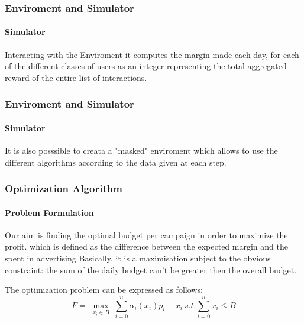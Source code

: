 \documentclass{beamer}
\begin{document}
\begin {frame}
\frametitle{Enviroment and Simulator}
\framesubtitle{Simulator}
Interacting with the Enviroment it computes the margin made each day, for each of the different classes of users as an integer representing the total aggregated reward of the entire list of interactions.
\end{frame}
\begin {frame}
\frametitle{Enviroment and Simulator}
\framesubtitle{Simulator}
It is also posssible to creata a "masked" enviroment which allows to use the different algorithms according to the data given at each step.
\end{frame}

\begin {frame}
\frametitle{Optimization Algorithm}
\framesubtitle{Problem Formulation}
Our aim is finding the optimal budget per campaign in order to maximize the profit.
which is defined as the difference between the expected margin and the spent in advertising 
Basically, it is a maximisation subject to the obvious constraint: the sum of the daily budget can't be greater then the overall budget.

The optimization problem can be expressed as follows:
\begin{displaymath}
F=\max_{\substack{x_i\in B}} \sum_{i=0}^n \alpha_i(x_i)p_i-x_i \ s.t. \sum_{i=0}^n x_i\leq B  
\end{displaymath}
\end{frame}
\end{document}
